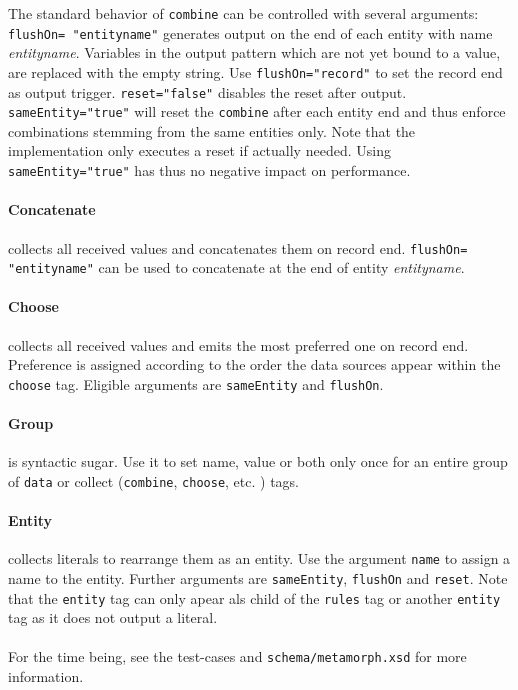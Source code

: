 \documentclass[12pt,a4paper]{article}
\begin{document}
The standard behavior of {\tt combine} can be controlled with several arguments:
{\tt flushOn= "entityname"} generates output on the end of each entity with name {\it entityname}. Variables in the output pattern which are not yet bound to a value, are replaced with the empty string. Use {\tt flushOn="record"} to set the record end as output trigger.
{\tt reset="false"} disables the reset after output.
{\tt sameEntity="true"} will reset the {\tt combine} after each entity end and thus enforce combinations stemming from the same entities only. Note that the implementation only executes a reset if actually needed. Using {\tt sameEntity="true"} has thus no negative impact on performance.

\paragraph{Concatenate}
collects all received values and concatenates them on record end. {\tt flushOn= "entityname"} can be used to concatenate at the end of entity {\it entityname}.

\paragraph{Choose}
collects all received values and emits the most preferred one on record end. Preference is assigned according to the order the data sources appear within the {\tt choose} tag.  Eligible arguments are {\tt sameEntity} and {\tt flushOn}.

\paragraph{Group} is syntactic sugar. Use it to set name, value or both only once for an entire group of {\tt data} or collect ({\tt combine}, {\tt choose}, etc. ) tags.

\paragraph{Entity} collects literals to rearrange them as an entity. Use the argument {\tt name} to assign a name to the entity. Further arguments are {\tt sameEntity}, {\tt flushOn} and {\tt reset}. Note that the {\tt entity} tag can only apear als child of the {\tt rules} tag or another {\tt entity} tag as it does not output a literal.

\paragraph{}For the time being, see the test-cases and {\tt schema/metamorph.xsd} for more information.
\end{document}
